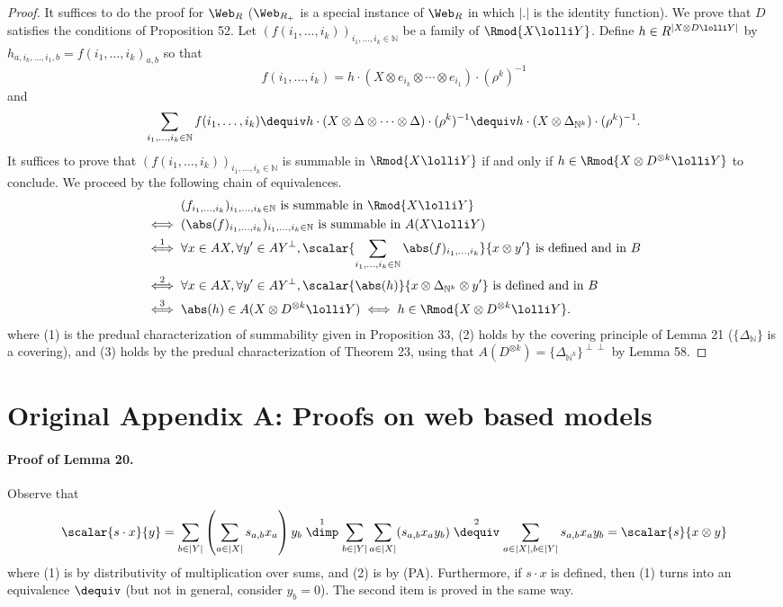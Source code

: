 \begin{proof}
It suffices to do the proof for $\Web_R$ ($\Web_{R_+}$ is a special instance of $\Web_R$ in which $|.|$ is the identity function). We prove that $D$ satisfies the conditions of Proposition 52. Let $(f(i_1,\ldots,i_k))_{i_1,\ldots,i_k\in\mathbb N}$ be a family of $\Rmod{X\lolli Y}$. Define $h\in R^{|X\otimes D\lolli Y|}$ by $h_{a,i_k,\ldots,i_1,b}=f(i_1,\ldots,i_k)_{a,b}$ so that
\[f(i_1,\ldots,i_k)=h\cdot(X\otimes e_{i_k}\otimes\cdots\otimes e_{i_1})\cdot(\rho^k)^{-1}\]
and
\[\sum_{i_1,\ldots,i_k\in\mathbb N}f(i_1,\ldots,i_k)\dequiv h\cdot(X\otimes\Delta\otimes\cdots\otimes\Delta)\cdot(\rho^k)^{-1}\dequiv h\cdot(X\otimes\Delta_{\mathbb N^k})\cdot(\rho^k)^{-1}.\]
It suffices to prove that $(f(i_1,\ldots,i_k))_{i_1,\ldots,i_k\in\mathbb N}$ is summable in $\Rmod{X\lolli Y}$ if and only if $h\in\Rmod{X\otimes D^{\otimes k}\lolli Y}$ to conclude. We proceed by the following chain of equivalences.
\begin{align*}
&(f_{i_1,\ldots,i_k})_{i_1,\ldots,i_k\in\mathbb N}\text{ is summable in }\Rmod{X\lolli Y}\\
\iff{}&(\abs(f)_{i_1,\ldots,i_k})_{i_1,\ldots,i_k\in\mathbb N}\text{ is summable in }A(X\lolli Y)\\
\mathrel{\stackrel{1}{\iff}}{}&\forall x\in AX,\forall y'\in AY^\perp,\scalar{\sum_{i_1,\ldots,i_k\in\mathbb N}\abs(f)_{i_1,\ldots,i_k}}{x\otimes y'}\text{ is defined and in }B\\
\mathrel{\stackrel{2}{\iff}}{}&\forall x\in AX,\forall y'\in AY^\perp,\scalar{\abs(h)}{x\otimes\Delta_{\mathbb N^k}\otimes y'}\text{ is defined and in }B\\
\mathrel{\stackrel{3}{\iff}}{}&\abs(h)\in A(X\otimes D^{\otimes k}\lolli Y)\iff h\in\Rmod{X\otimes D^{\otimes k}\lolli Y}.
\end{align*}
where (1) is the predual characterization of summability given in Proposition 33, (2) holds by the covering principle of Lemma 21 ($\{\Delta_{\mathbb N}\}$ is a covering), and (3) holds by the predual characterization of Theorem 23, using that $A(D^{\otimes k})=\{\Delta_{\mathbb N^k}\}^{\perp\perp}$ by Lemma 58.
\end{proof}
\section*{Original Appendix A: Proofs on web based models}
\paragraph{Proof of Lemma 20.} Observe that
\[\scalar{s\cdot x}{y}=\sum_{b\in|Y|}\left(\sum_{a\in|X|}s_{a,b}x_a\right)y_b\mathrel{\stackrel{1}{\dimp}}\sum_{b\in|Y|}\sum_{a\in|X|}(s_{a,b}x_ay_b)\mathrel{\stackrel{2}{\dequiv}}\sum_{a\in|X|,b\in|Y|}s_{a,b}x_ay_b=\scalar{s}{x\otimes y}\]
where (1) is by distributivity of multiplication over sums, and (2) is by (PA). Furthermore, if $s\cdot x$ is defined, then (1) turns into an equivalence $\dequiv$ (but not in general, consider $y_b=0$). The second item is proved in the same way.
